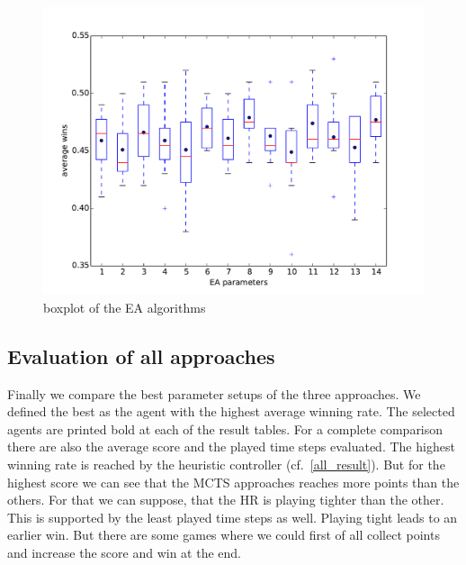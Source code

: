 \begin{figure}[H]
\centering
\includegraphics[scale=0.6]{images/eval_evolutionary.pdf}
\caption{boxplot of the \ac{EA} algorithms}
\label{fig:eval_evo}
\end{figure}




\subsection{Evaluation of all approaches} 

Finally we compare the best parameter setups of the three approaches. We defined the best as the agent with the highest average winning rate.
The selected agents are printed bold at each of the result tables.
For a complete comparison there are also the average score and the played time steps evaluated.
The highest winning rate is reached by the heuristic controller (cf.~\cref{all_result}).
But for the highest score we can see that the \ac{MCTS} approaches reaches more points than the others.
For that we can suppose, that the \ac{HR} is playing tighter than the other. This is supported by the least played time steps as well.
Playing tight leads to an earlier win. But there are some games where we could first of all collect points and increase the score and
win at the end.



